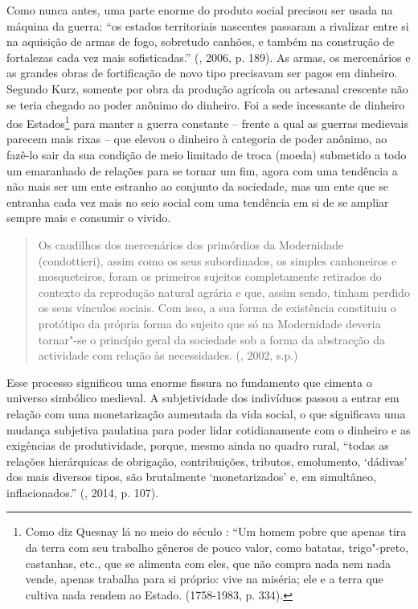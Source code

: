 Como nunca antes, uma parte enorme do produto social precisou ser usada
na máquina da guerra: ``os estados territoriais nascentes passaram a
rivalizar entre si na aquisição de armas de fogo, sobretudo canhões, e
também na construção de fortalezas cada vez mais sofisticadas.'' (,
2006, p. 189). As armas, os mercenários e as grandes obras de
fortificação de novo tipo precisavam ser pagos em dinheiro. Segundo
Kurz, somente por obra da produção agrícola ou artesanal crescente não
se teria chegado ao poder anônimo do dinheiro. Foi a sede incessante de
dinheiro dos Estados\footnote{Como diz Quesnay lá no meio do século
  : ``Um homem pobre que apenas tira da terra com seu trabalho
  gêneros de pouco valor, como batatas, trigo"-preto, castanhas, etc.,
  que se alimenta com eles, que não compra nada nem nada vende, apenas
  trabalha para si próprio: vive na miséria; ele e a terra que cultiva
  nada rendem ao Estado. (1758-1983, p. 334).} para manter a guerra
constante -- frente a qual as guerras medievais parecem mais rixas --
que elevou o dinheiro à categoria de poder anônimo, ao fazê-lo sair da
sua condição de meio limitado de troca (moeda) submetido a todo um
emaranhado de relações para se tornar um fim, agora com uma tendência a
não mais ser um ente estranho ao conjunto da sociedade, mas um ente que
se entranha cada vez mais no seio social com uma tendência em si de se
ampliar sempre mais e consumir o vivido.

\begin{quote}
Os caudilhos dos mercenários dos primórdios da Modernidade
(condottieri), assim como os seus subordinados, os simples canhoneiros e
mosqueteiros, foram os primeiros sujeitos completamente retirados do
contexto da reprodução natural agrária e que, assim sendo, tinham
perdido os seus vínculos sociais. Com isso, a sua forma de existência
constituiu o protótipo da própria forma do sujeito que só na Modernidade
deveria tornar"-se o princípio geral da sociedade sob a forma da
abstracção da actividade com relação às necessidades. (, 2002, s.p.)
\end{quote}

Esse processo significou uma enorme fissura no fundamento que cimenta o
universo simbólico medieval. A subjetividade dos indivíduos passou a
entrar em relação com uma monetarização aumentada da vida social, o que
significava uma mudança subjetiva paulatina para poder lidar
cotidianamente com o dinheiro e as exigências de produtividade, porque,
mesmo ainda no quadro rural, ``todas as relações hierárquicas de
obrigação, contribuições, tributos, emolumento, `dádivas' dos mais
diversos tipos, são brutalmente `monetarizados' e, em simultâneo,
inflacionados.'' (, 2014, p. 107).

